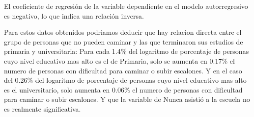 \documentclass[11pt,]{article}
\begin{document}
El coeficiente de regresión de la variable dependiente en el modelo
autorregresivo es negativo, lo que indica una relación inversa.

Para estos datos obtenidos podriamos deducir que hay relacion directa
entre el grupo de personas que no pueden caminar y las que terminaron
sus estudios de primaria y universitaria: Para cada 1.4\% del logaritmo
de porcentaje de personas cuyo nivel educativo mas alto es el de
Primaria, solo se aumenta en 0.17\% el numero de personas con dificultad
para caminar o subir escalones. Y en el caso del 0.26\% del logaritmo de
porcentaje de personas cuyo nivel educativo mas alto es el
universitario, solo aumenta en 0.06\% el numero de personas con
dificultad para caminar o subir escalones. Y que la variable de Nunca
asistió a la escuela no es realmente significativa.




\newpage
\singlespacing 
\end{document}
